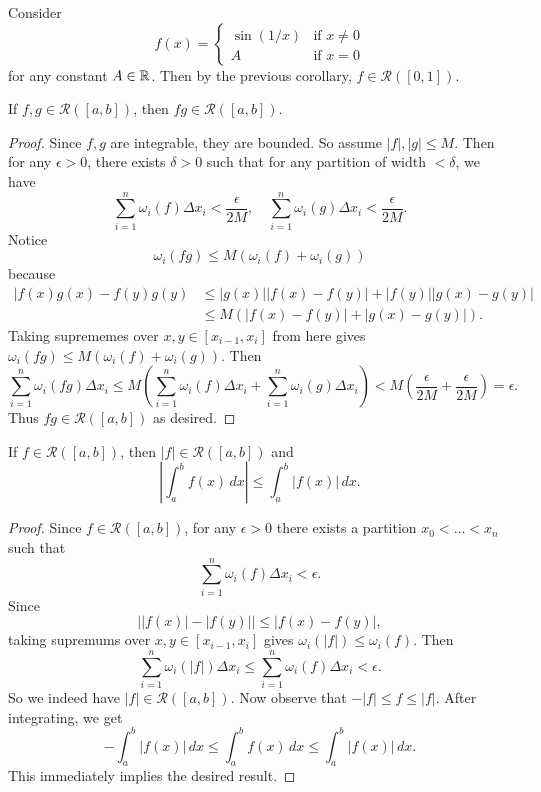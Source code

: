 \begin{example}
  Consider
  \[
    f(x) =
    \begin{cases}
      \sin(1 / x) & \text{if } x \ne 0 \\
      A & \text{if } x = 0
    \end{cases}
  \]
  for any constant $A \in \mathbb{R}$. Then by the previous
  corollary, $f \in \mathcal{R}([0, 1])$.
\end{example}

\begin{theorem}
  If $f, g \in \mathcal{R}([a, b])$, then
  $fg \in \mathcal{R}([a, b])$.
\end{theorem}

\begin{proof}
  Since $f, g$ are integrable, they are bounded.
  So assume $|f|, |g| \le M$. Then for any $\epsilon > 0$,
  there exists $\delta > 0$ such that for any
  partition of width $< \delta$, we have
  \[
    \sum_{i = 1}^n \omega_i(f) \Delta x_i <
    \frac{\epsilon}{2M}, \quad
    \sum_{i = 1}^n \omega_i(g) \Delta x_i <
    \frac{\epsilon}{2M}.
  \]
  Notice
  \[
    \omega_i(fg) \le M(\omega_i(f) + \omega_i(g))
  \]
  because
  \begin{align*}
    |f(x) g(x) - f(y) g(y)
    &\le |g(x)| |f(x) - f(y)| + |f(y)| |g(x) - g(y)| \\
    &\le M(|f(x) - f(y)| + |g(x) - g(y)|).
  \end{align*}
  Taking suprememes over $x, y \in [x_{i - 1}, x_i]$ from
  here
  gives $\omega_i(fg) \le M(\omega_i(f) + \omega_i(g))$.
  Then
  \[
    \sum_{i = 1}^n \omega_i(fg) \Delta x_i
    \le M \left(\sum_{i = 1}^n \omega_i(f) \Delta x_i + \sum_{i = 1}^n \omega_i(g) \Delta x_i\right)
    < M\left(\frac{\epsilon}{2M} + \frac{\epsilon}{2M}\right) = \epsilon.
  \]
  Thus $fg \in \mathcal{R}([a, b])$ as desired.
\end{proof}

\begin{theorem}
  If $f \in \mathcal{R}([a, b])$, then
  $|f| \in \mathcal{R}([a, b])$ and
  \[
    \left| \int_a^b f(x) \, dx \right| \le \int_a^b |f(x)| \, dx.
  \]
\end{theorem}

\begin{proof}
  Since $f \in \mathcal{R}([a, b])$, for any
  $\epsilon > 0$ there exists a partition
  $x_0 < \dots < x_n$ such that
  \[
    \sum_{i = 1}^n \omega_i(f) \Delta x_i < \epsilon.
  \]
  Since
  \[
    \big||f(x)| - |f(y)|\big| \le |f(x) - f(y)|,
  \]
  taking supremums over $x, y \in [x_{i - 1}, x_i]$
  gives $\omega_i(|f|) \le \omega_i(f)$. Then
  \[
    \sum_{i = 1}^n \omega_i(|f|) \Delta x_i
    \le \sum_{i = 1}^n \omega_i(f) \Delta x_i < \epsilon.
  \]
  So we indeed have $|f| \in \mathcal{R}([a, b])$.
  Now observe that $-|f| \le f \le |f|$. After
  integrating, we get
  \[
    -\int_a^b |f(x)| \, dx \le \int_a^b f(x) \, dx \le \int_a^b |f(x)| \, dx.
  \]
  This immediately implies the desired result.
\end{proof}


